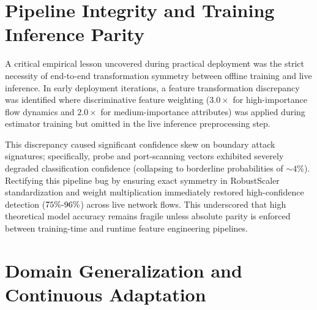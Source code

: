 \documentclass[12pt,a4paper]{report}
\begin{document}
\section{Pipeline Integrity and Training Inference Parity}

A critical empirical lesson uncovered during practical deployment was the strict necessity of end-to-end transformation symmetry between offline training and live inference. In early deployment iterations, a feature transformation discrepancy was identified where discriminative feature weighting ($3.0\times$ for high-importance flow dynamics and $2.0\times$ for medium-importance attributes) was applied during estimator training but omitted in the live inference preprocessing step. 

This discrepancy caused significant confidence skew on boundary attack signatures; specifically, probe and port-scanning vectors exhibited severely degraded classification confidence (collapsing to borderline probabilities of $\sim 4\%$). Rectifying this pipeline bug by ensuring exact symmetry in RobustScaler standardization and weight multiplication immediately restored high-confidence detection ($75\%\text - 96\%$) across live network flows. This underscored that high theoretical model accuracy remains fragile unless absolute parity is enforced between training-time and runtime feature engineering pipelines.

\section{Domain Generalization and Continuous Adaptation}
\end{document}
